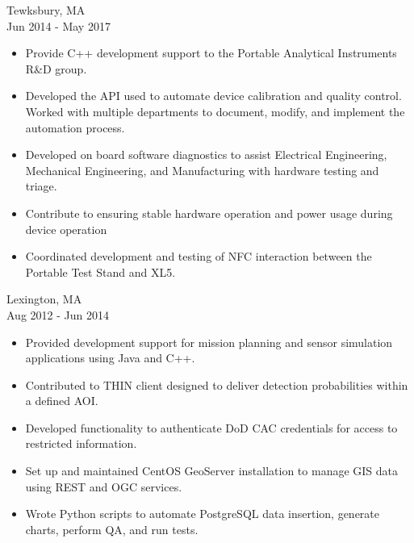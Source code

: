 \documentclass[10pt]{article}
\begin{document}
 \hfill Tewksbury, MA \\
 \hfill Jun 2014 - May 2017
\begin{itemize}
\setlength\itemsep{0em}
\item Provide C++ development support to the Portable Analytical Instruments R\&D group.
\item Developed the API used to automate device calibration and quality control. Worked with multiple departments to document, modify, and implement the automation process.
\item Developed on board software diagnostics to assist Electrical Engineering, Mechanical Engineering, and Manufacturing with hardware testing and triage.
\item Contribute to ensuring stable hardware operation and power usage during device operation
\item Coordinated development and testing of NFC interaction between the Portable Test Stand and XL5. 
\end{itemize}

 \hfill Lexington, MA \\
 \hfill Aug 2012 - Jun 2014
\begin{itemize}
\setlength\itemsep{0em}
\item Provided development support for mission planning and sensor simulation applications using Java and C++.
\item Contributed to THIN client designed to deliver detection probabilities within a defined AOI.
\item Developed functionality to authenticate DoD CAC credentials for access to restricted information.
\item Set up and maintained CentOS GeoServer installation to manage GIS data using REST and OGC services.
\item Wrote Python scripts to automate PostgreSQL data insertion, generate charts, perform QA, and run tests.
\end{itemize}
\end{document}
